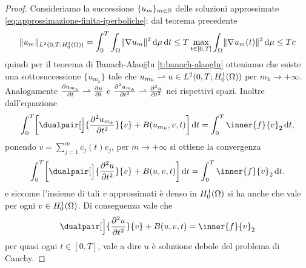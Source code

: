 \begin{proof}
    Consideriamo la successione $\{u_m\}_{m\in\N}$ delle soluzioni approssimate \eqref{eq:approssimazione-finita-iperboliche}: dal teorema precedente
    \begin{equation}
        \norm{u_m}_{\leb[2]{0,T;\sobHc[1]{\Omega}}}=
        \int_0^T\int_\Omega\norm{\grad u_m}^2\,\dd\mu\,\dd t\le
        T\max_{t\in[0,T]}\int_\Omega\norm{\grad u_m(t)}^2\,\dd\mu\le
        Tc
    \end{equation}
    quindi per il teorema di Banach-Alao\u{g}lu \ref{t:banach-alaoglu} otteniamo che esiste una sottosuccessione $\{u_{m_k}\}$ tale che $u_{m_k}\weakto u\in\leb[2]{0,T;\sobHc[1]{\Omega}}$ per $m_k\to+\infty$.
    Analogamente $\drp{u_{m_k}}{t}\weakto\drp{u}{t}$ e $\ddrp{u_{m_k}}{t}\weakto\ddrp{u}{t}$ nei rispettivi spazi.
    Inoltre dall'equazione
    \begin{equation}
        \int_0^T\biggl[\dualpair[\Big]{\ddrp{u_{m_k}}{t}}{v}+B(u_{m_k},v,t)\biggr]\,\dd t=\int_0^T\inner{f}{v}_2\,\dd t,
    \end{equation}
    ponendo $v=\sum_{j=1}^mc_j(t)e_j$, per $m\to+\infty$ si ottiene la convergenza
    \begin{equation}
        \int_0^T\biggl[\dualpair[\Big]{\ddrp{u}{t}}{v}+B(u,v,t)\biggr]\,\dd t=\int_0^T\inner{f}{v}_2\,\dd t.
    \end{equation}
    e siccome l'insieme di tali $v$ approssimati è denso in $\sobHc[1]{\Omega}$ si ha anche che vale per ogni $v\in\sobHc[1]{\Omega}$.
    Di conseguenza vale che
    \begin{equation}
        \dualpair[\Big]{\ddrp{u}{t}}{v}+B(u,v,t)=\inner{f}{v}_2
    \end{equation}
    per quasi ogni $t\in[0,T]$, vale a dire $u$ è soluzione debole del problema di Cauchy.


\end{proof}
